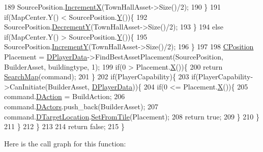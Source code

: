 \begin{DoxyCode}
189             SourcePosition.\hyperlink{classCPosition_aa5955d67d5ab7ca74d80cb7303b6eaa9}{IncrementX}(TownHallAsset->Size()/2);
190         \}
191         \textcolor{keywordflow}{if}(MapCenter.Y() < SourcePosition.\hyperlink{classCPosition_a1aa8a30e2f08dda1f797736ba8c13a87}{Y}())\{
192             SourcePosition.\hyperlink{classCPosition_a51ee44d9e0457d6277567fd8a66fdec7}{DecrementY}(TownHallAsset->Size()/2);   
193         \}
194         \textcolor{keywordflow}{else} \textcolor{keywordflow}{if}(MapCenter.Y() > SourcePosition.\hyperlink{classCPosition_a1aa8a30e2f08dda1f797736ba8c13a87}{Y}())\{
195             SourcePosition.\hyperlink{classCPosition_a3f2a26798bb27b1252ff1be303b3adfc}{IncrementY}(TownHallAsset->Size()/2);
196         \}
197 
198         \hyperlink{classCPosition}{CPosition} Placement = \hyperlink{classCAIPlayer_a83b5113c8f7e80df54940b647c5ee2e6}{DPlayerData}->FindBestAssetPlacement(SourcePosition, 
      BuilderAsset, buildingtype, 1);
199         \textcolor{keywordflow}{if}(0 > Placement.\hyperlink{classCPosition_a9a6b94d3b91df1492d166d9964c865fc}{X}())\{
200             \textcolor{keywordflow}{return} \hyperlink{classCAIPlayer_afafbe8fc589e09a16ae1f02f2794d7b0}{SearchMap}(command);
201         \}
202         \textcolor{keywordflow}{if}(PlayerCapability)\{
203             \textcolor{keywordflow}{if}(PlayerCapability->CanInitiate(BuilderAsset, \hyperlink{classCAIPlayer_a83b5113c8f7e80df54940b647c5ee2e6}{DPlayerData}))\{
204                 \textcolor{keywordflow}{if}(0 <= Placement.\hyperlink{classCPosition_a9a6b94d3b91df1492d166d9964c865fc}{X}())\{
205                     command.\hyperlink{structSPlayerCommandRequest_a80897bbccf2c4e0b148a7aa815a926c6}{DAction} = BuildAction;
206                     command.\hyperlink{structSPlayerCommandRequest_aa37fc01519676345703d78b9f573894a}{DActors}.push\_back(BuilderAsset);
207                     command.\hyperlink{structSPlayerCommandRequest_a701702b94ca2fd2738e95ef6711dd41a}{DTargetLocation}.\hyperlink{classCPosition_a46994e6a8b8e3b4237edd7259ad844b6}{SetFromTile}(Placement);
208                     \textcolor{keywordflow}{return} \textcolor{keyword}{true};
209                 \}
210             \}
211         \}
212     \}
213 
214     \textcolor{keywordflow}{return} \textcolor{keyword}{false};
215 \}
\end{DoxyCode}
Here is the call graph for this function\+:\nopagebreak
